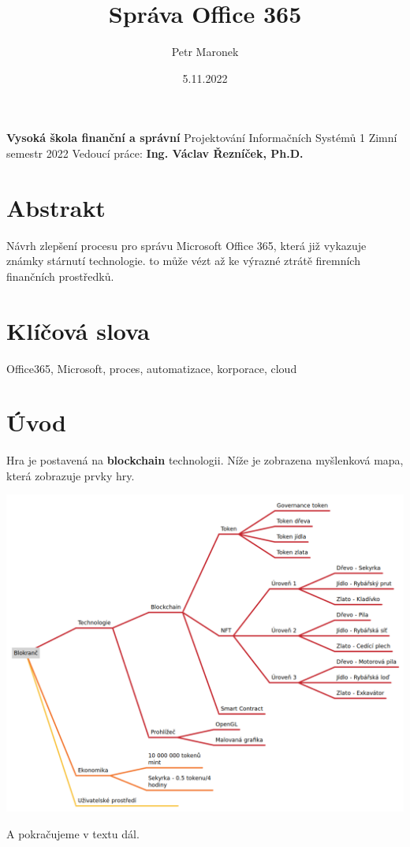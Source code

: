 \documentclass{article}
\title{Správa Office 365}
\author{Petr Maronek}
\date{5.11.2022}
\begin{document}
	\begin{spacing}{1.15}
		\rmfamily
		\maketitle
		\begin{center}
			\textbf{Vysoká škola finanční a správní}\linebreak
			Projektování Informačních Systémů 1\linebreak
			Zimní semestr 2022\linebreak
			Vedoucí práce: \textbf{Ing. Václav Řezníček, Ph.D.}
		\end{center}
		\pagebreak
			
		\section*{Abstrakt}
		Návrh zlepšení procesu pro správu Microsoft Office 365, která již vykazuje známky stárnutí technologie. to může vézt až ke výrazné ztrátě firemních finančních prostředků.
		 
		\section*{Klíčová slova}
		Office365, Microsoft, proces, automatizace, korporace, cloud
		\pagebreak
		    
		\section*{Úvod}
		Hra je postavená na \textbf{blockchain} technologii. Níže je zobrazena myšlenková mapa, která zobrazuje prvky hry.\linebreak
		
		\label{Myšlenková mapa}
		\includegraphics[scale=0.3]{221104-NPH-Blokranč.png}
		
		A pokračujeme v textu dál.
	
	\end{spacing}
\end{document}

